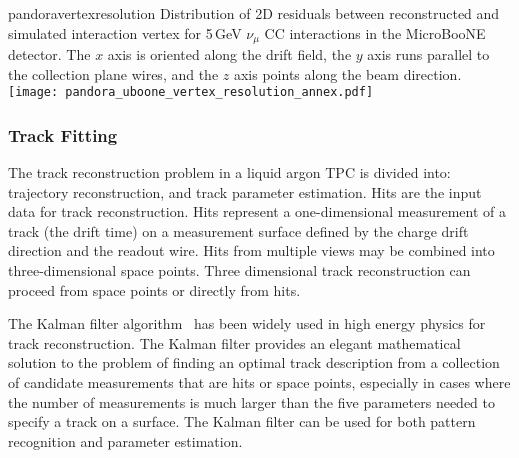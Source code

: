 \begin{cdrfigure}{pandoravertexresolution}
{Distribution of 2D residuals between reconstructed and simulated interaction
 vertex for 5\,GeV $\nu_{\mu}$ CC interactions in the MicroBooNE detector.
 The $x$ axis is oriented along the drift field, the $y$ axis runs parallel 
 to the collection plane wires, and the $z$ axis points along the beam direction.}
\texttt{[image: pandora\_uboone\_vertex\_resolution\_annex.pdf]}
\end{cdrfigure}


\subsubsection{Track Fitting}


The track reconstruction problem in a liquid argon TPC is divided
into: trajectory reconstruction, and track parameter estimation.
Hits are the input data for track reconstruction. Hits represent a
one-dimensional measurement of a track (the drift time) on a
measurement surface defined by the charge drift direction and the
readout wire. Hits from multiple views may be combined into
three-dimensional space points. Three dimensional track reconstruction
can proceed from space points or directly from hits.

The Kalman filter algorithm~\cite{kalman} has been widely used in high
energy physics for track reconstruction. The Kalman filter provides an
elegant mathematical solution to the problem of finding an optimal
track description from a collection of candidate measurements that are
hits or space points, especially in cases where the number of
measurements is much larger than the five parameters needed to specify
a track on a surface.  The Kalman filter can be used for both pattern
recognition and parameter estimation.




